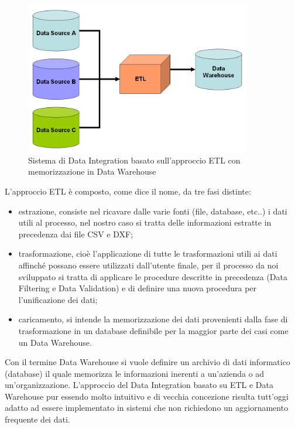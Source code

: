 \documentclass[12pt]{report}
\begin{document}
\begin{figure}[H]
    \centering
    \includegraphics[width=280pt]{ETL+Datawarehouse.jpg}
    \caption{Sistema di Data Integration basato sull'approccio ETL con memorizzazione in Data Warehouse}
    \label{fig:ETL_Datawarehouse}
\end{figure}

\vspace{5mm} %

L'approccio ETL è composto, come dice il nome, da tre fasi distinte:
\begin{itemize}
\item estrazione, consiste nel ricavare dalle varie fonti (file, database, etc..) i dati utili al processo, nel nostro caso si tratta delle informazioni estratte in precedenza dai file CSV e DXF;
\item trasformazione, cioè l'applicazione di tutte le trasformazioni utili ai dati affinché possano essere utilizzati dall'utente finale, per il processo da noi sviluppato si tratta di applicare le procedure descritte in precedenza (Data Filtering e Data Validation) e di definire una nuova procedura per l'unificazione dei dati;
\item caricamento, si intende la memorizzazione dei dati provenienti dalla fase di trasformazione in un database definibile per la maggior parte dei casi come un Data Warehouse.
\end{itemize}

\newpage

Con il termine Data Warehouse si vuole definire un archivio di dati informatico (database) il quale memorizza le informazioni inerenti a un'azienda o ad un'organizzazione.
L'approccio del Data Integration basato su ETL e Data Warehouse pur essendo molto intuitivo e di vecchia concezione risulta tutt'oggi adatto ad essere implementato in sistemi che non richiedono un aggiornamento frequente dei dati.
\end{document}
